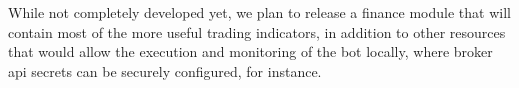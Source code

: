 \documentclass[preprint,1p,times]{elsarticle}
\begin{document}
While not completely developed yet, we plan to release a finance module that will contain most of the more useful 
trading indicators, in addition to other resources that would allow the execution and monitoring of the bot locally, 
where broker api secrets can be securely configured, for instance.






\begin{thebibliography}{00}


\bibitem{}

\end{thebibliography}
\end{document}
